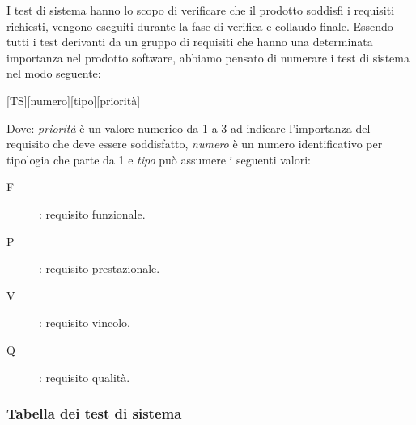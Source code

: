 \documentclass[../../piano-di-qualifica.tex]{subfiles}
\begin{document}
I test di sistema hanno lo scopo di verificare che il prodotto soddisfi i requisiti richiesti, vengono eseguiti durante la fase di verifica e collaudo finale.
Essendo tutti i test derivanti da un gruppo di requisiti che hanno una determinata importanza nel prodotto software, abbiamo pensato di numerare i test di sistema nel modo seguente:
\begin{center}
  [TS][numero][tipo][priorità]
\end{center}

Dove: \textit{priorità} è un valore numerico da 1 a 3 ad indicare l'importanza del requisito che deve essere soddisfatto, \textit{numero} è un numero identificativo per tipologia che parte da 1 e \textit{tipo} può assumere i seguenti valori:
\begin{description}
  \item [F]: requisito funzionale.
  \item [P]: requisito prestazionale.
  \item [V]: requisito vincolo.
  \item [Q]: requisito qualità.
\end{description}
\newpage
\subsubsection{Tabella dei test di sistema}%
\label{subsub:tabella_test_sistema}
\end{document}
